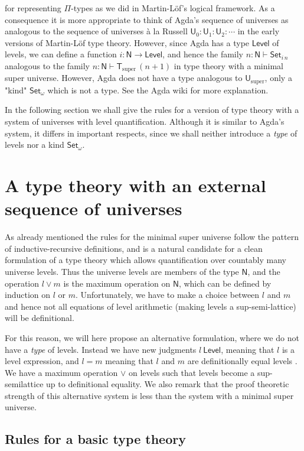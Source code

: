 \documentclass[11pt,a4paper]{article}
\def\UU{\mathsf{U}}
\def\Level{\mathsf{Level}}
\newcommand{\N}{\mathsf{N}}
\newcommand{\Set}{\mathsf{Set}}
\newcommand{\T}{\mathsf{T}}
\newcommand{\Usuper}{\UU_{\mathrm{super}}}
\newcommand{\Tsuper}{\T_{\mathrm{super}}}
\begin{document}
for representing $\Pi$-types as we did in Martin-Löf's logical framework. As a consequence it is more appropriate to think of Agda's sequence of universes as analogous to the sequence of universes  \`a la Russell $ \UU_0 : \UU_1 : \UU_2 : \cdots$ in the early versions of Martin-Löf type theory. However, since Agda has a type $\Level$ of levels, we can define a function $i : \N \to \Level$, and hence the family $n : \N \vdash \Set_{i\, n}$ analogous to the family $n : \N \vdash \Tsuper\,(n + 1)$ in type theory with a minimal super universe. However, Agda does not have a type analogous to $\Usuper$, only a "kind" $\Set_\omega$ which is not a type. See the Agda wiki for more explanation.

In the following section we shall give the rules for a version of type theory with a system of universes with level quantification. Although it is similar to Agda's system, it differs in important respects, since we shall neither introduce a {\em type} of levels nor a kind $\Set_\omega$.

\section{A type theory with an external sequence of universes}\label{external}

As already mentioned the rules for the minimal super universe follow the pattern of inductive-recursive definitions, and is a natural candidate for a clean formulation of a type theory which allows quantification over countably many universe levels. Thus the universe levels are members of the type $\N$, and the operation $l \vee m$ is the maximum operation on $\N$, which can be defined by induction on $l$ or $m$. Unfortunately, we have to make a choice between $l$ and $m$ and hence not all equations of level arithmetic (making levels a sup-semi-lattice) will be definitional.

For this reason, we will here propose an alternative formulation, where we do not have a {\em type} of levels. Instead we have new judgments $l\ \Level$, meaning that $l$ is a level expression, and $l = m$ meaning that $l$ and $m$ are definitionally equal levels . We have a maximum operation $\vee$ on levels such that levels become a sup-semilattice up to definitional equality. We also remark that the proof theoretic strength of this alternative system is less than the system with a minimal super universe.

\subsection*{Rules for a basic type theory}
\end{document}
